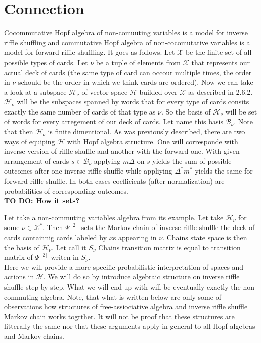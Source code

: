 \documentclass[a4paper, 12pt]{report}
\newcommand{\todo}[1]{\hfill \break \textbf{\Huge TO DO: #1 \hfill \break}\normalsize}
\begin{document}
\chapter{Connection}

Cocommutative Hopf algebra of non-comuuting variables is a model for inverse riffle shuffling and commutative 
Hopf algebra of non-cocomutative variables is a model for forward riffle shuffling. It goes as follows.
Let $\mathcal{X}$ be the finite set of all possible types of cards. Let $\nu$ be a tuple of 
elements from $\mathcal{X}$ that represents our actual deck of cards (the same type of card can occour
multiple times, the order in $\nu$ schould be the order in which we think cards are ordered). Now we can 
take a look at a subspace $\mathcal{H}_\nu$ of vector space $\mathcal{H}$ builded over $\mathcal{X}$ as 
described in 2.6.2. $\mathcal{H}_\nu$ will be the subspaces spanned by words that for every type of cards 
consits exactly the same number of cards of that type as $\nu$. So the basis of $\mathcal{H}_\nu$ will be set 
of words for every arregement of our deck of cards. Let name this basis $\mathcal{B}_\nu$. Note that then 
$\mathcal{H}_\nu$ is finite dimentional. As was previously described, there are two ways of equiping 
$\mathcal{H}$ with Hopf algebra structure. One will corresponde with inverse version of riffle shuffle and 
another with the forward one. With given arrangement of cards $s \in \mathcal{B}_\nu$ applying $m\Delta$ on 
$s$ yields the sum of possible outcomes after one inverse riffle shuffle while appliying $\Delta^*m^*$ 
yields the same for forward riffle shuffle. In both cases coefficients (after normalization) are 
probabilities of corresponding outcomes. \\[4pt]

\todo{How it sets?}

Let take a non-commuting variables algebra from its example. Let take $\mathcal{H}_\nu$ for some 
$\nu \in \mathcal{X}^*$. Then $\Psi^{[2]}$ sets the Markov chain of inverse riffle shuffle the deck of cards 
containnig cards labeled by $x$s appearing in $\nu$. Chains state space is then the basis of 
$\mathcal{H}_\nu$. Let call it $S_\nu$ 
Chains transition matrix is equal to transition matrix of $\Psi^{[2]}$ writen in $S_\nu$.  \\


Here we will provide a more specific probabilistic interpretation of spaces and actions in $\mathcal{H}$.
We will do so by introduce algebraic structure on inverse riffle shuffle step-by-step. What we will end 
up with will be eventually exactly the non-commuting algebra. Note, that what is written below are only 
some of observations how structures of free-assiociative algebra and inverse riffle shuffle Markov chain 
works togrther. It will not be proof that these structures are litterally the same nor that these arguments 
apply  in general to all Hopf algebras and Markov chains.\\[4pt]
\end{document}
